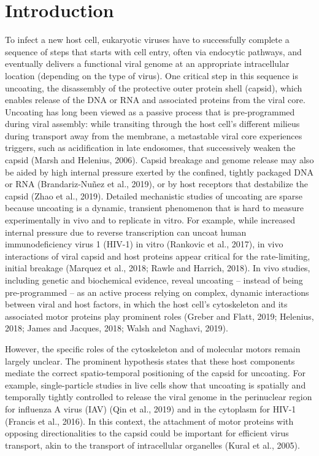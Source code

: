 \section{Introduction}

To infect a new host cell, eukaryotic viruses have to successfully complete a sequence of steps that starts with cell entry, often via endocytic pathways, and eventually delivers a functional viral genome at an appropriate intracellular location (depending on the type of virus). One critical step in this sequence is uncoating, the disassembly of the protective outer protein shell (capsid), which enables release of the DNA or RNA and associated proteins from the viral core. Uncoating has long been viewed as a passive process that is pre-programmed during viral assembly: while transiting through the host cell’s different milieus during transport away from the membrane, a metastable viral core experiences triggers, such as acidification in late endosomes, that successively weaken the capsid (Marsh and Helenius, 2006). Capsid breakage and genome release may also be aided by high internal pressure exerted by the confined, tightly packaged DNA or RNA (Brandariz-Nuñez et al., 2019), or by host receptors that destabilize the capsid (Zhao et al., 2019). Detailed mechanistic studies of uncoating are sparse because uncoating is a dynamic, transient phenomenon that is hard to measure experimentally in vivo and to replicate in vitro. For example, while increased internal pressure due to reverse transcription can uncoat human immunodeficiency virus 1 (HIV-1) in vitro (Rankovic et al., 2017), in vivo interactions of viral capsid and host proteins appear critical for the rate-limiting, initial breakage (Marquez et al., 2018; Rawle and Harrich, 2018). In vivo studies, including genetic and biochemical evidence, reveal uncoating – instead of being pre-programmed – as an active process relying on complex, dynamic interactions between viral and host factors, in which the host cell’s cytoskeleton and its associated motor proteins play prominent roles (Greber and Flatt, 2019; Helenius, 2018; James and Jacques, 2018; Walsh and Naghavi, 2019).

However, the specific roles of the cytoskeleton and of molecular motors remain largely unclear. The prominent hypothesis states that these host components mediate the correct spatio-temporal positioning of the capsid for uncoating. For example, single-particle studies in live cells show that uncoating is spatially and temporally tightly controlled to release the viral genome in the perinuclear region for influenza A virus (IAV) (Qin et al., 2019) and in the cytoplasm for HIV-1 (Francis et al., 2016). In this context, the attachment of motor proteins with opposing directionalities to the capsid could be important for efficient virus transport, akin to the transport of intracellular organelles (Kural et al., 2005).

